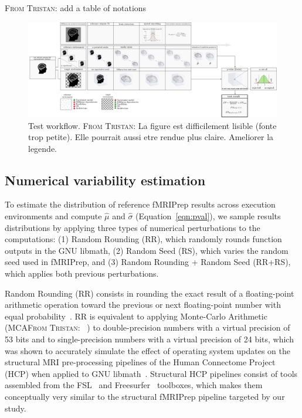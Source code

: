 \documentclass{article}
\newcommand{\TG}[1]{\color{blue}\textsc{From Tristan:} #1\color{black}\xspace}
\begin{document}
\TG{add a table of notations}

\begin{figure}
    \centering
    \includegraphics[width=\linewidth]{figures/stat_test_procedure.pdf}
	\caption{Test workflow. \TG{La figure est difficilement lisible (fonte trop petite). Elle pourrait aussi etre rendue plus claire. Ameliorer la legende.}}
    \label{fig:test_workflow}
\end{figure}

\subsection{Numerical variability estimation}

To estimate the distribution of reference fMRIPrep results across execution environments and compute $\hat \mu$ and $\hat \sigma$ (Equation~\ref{eqn:pval}), we sample results distributions by applying three types of numerical perturbations to the computations: (1) Random Rounding (RR), which randomly rounds function outputs in the GNU libmath, (2) Random Seed (RS), which varies the random seed used in fMRIPrep, and (3) Random Rounding + Random Seed (RR+RS), which applies both previous perturbations.

Random Rounding (RR) consists in rounding the exact result of a floating-point arithmetic operation toward the previous or next floating-point number with equal probability~\cite{forsythe1959reprint}. RR is equivalent to applying Monte-Carlo Arithmetic (MCA\TG{~\cite{cite}}) to double-precision numbers with a virtual precision of 53 bits and to single-precision numbers with a virtual precision of 24 bits, which was shown to accurately simulate the effect of operating system updates on the structural MRI pre-processing pipelines of the Human Connectome Project (HCP) when applied to GNU libmath~\cite{salari2021accurate}. Structural HCP pipelines consist of tools assembled from the FSL~\cite{jenkinson2012fsl} and Freesurfer~\cite{fischl2012freesurfer} toolboxes, which makes them conceptually very similar to the structural fMRIPrep pipeline targeted by our study.
\end{document}
